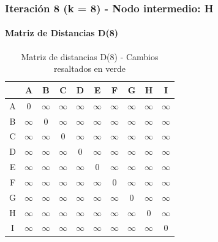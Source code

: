 \documentclass[12pt]{article}
\begin{document}
\subsubsection{Iteración 8 (k = 8) - Nodo intermedio: H}
\paragraph{Matriz de Distancias D(8)}
\begin{table}[h!]
\centering
\begin{tabular}{|c|c|c|c|c|c|c|c|c|c|}
\hline
 & A & B & C & D & E & F & G & H & I \\\hline
A & 0 & $\infty$ & $\infty$ & $\infty$ & $\infty$ & $\infty$ & $\infty$ & $\infty$ & $\infty$ \\\hline
B & $\infty$ & 0 & $\infty$ & $\infty$ & $\infty$ & $\infty$ & $\infty$ & $\infty$ & $\infty$ \\\hline
C & $\infty$ & $\infty$ & 0 & $\infty$ & $\infty$ & $\infty$ & $\infty$ & $\infty$ & $\infty$ \\\hline
D & $\infty$ & $\infty$ & $\infty$ & 0 & $\infty$ & $\infty$ & $\infty$ & $\infty$ & $\infty$ \\\hline
E & $\infty$ & $\infty$ & $\infty$ & $\infty$ & 0 & $\infty$ & $\infty$ & $\infty$ & $\infty$ \\\hline
F & $\infty$ & $\infty$ & $\infty$ & $\infty$ & $\infty$ & 0 & $\infty$ & $\infty$ & $\infty$ \\\hline
G & $\infty$ & $\infty$ & $\infty$ & $\infty$ & $\infty$ & $\infty$ & 0 & $\infty$ & $\infty$ \\\hline
H & $\infty$ & $\infty$ & $\infty$ & $\infty$ & $\infty$ & $\infty$ & $\infty$ & 0 & $\infty$ \\\hline
I & $\infty$ & $\infty$ & $\infty$ & $\infty$ & $\infty$ & $\infty$ & $\infty$ & $\infty$ & 0 \\\hline
\end{tabular}
\caption{Matriz de distancias D(8) - Cambios resaltados en verde}
\end{table}
\end{document}
